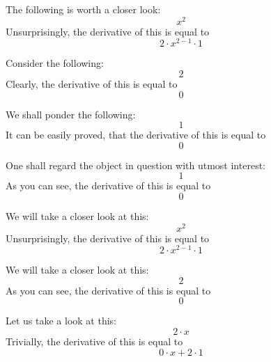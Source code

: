 \documentclass{article}
\begin{document}
The following is worth a closer look:
\begin{equation}
x ^{2 } 
\end{equation}
Unsurprisingly, the derivative of this is equal to
\begin{equation}
2 \cdot x ^{2 - 1 } \cdot 1 
\end{equation}

Consider the following:
\begin{equation}
2 
\end{equation}
Clearly, the derivative of this is equal to
\begin{equation}
0 
\end{equation}

We shall ponder the following:
\begin{equation}
1 
\end{equation}
It can be easily proved, that the derivative of this is equal to
\begin{equation}
0 
\end{equation}

One shall regard the object in question with utmost interest:
\begin{equation}
1 
\end{equation}
As you can see, the derivative of this is equal to
\begin{equation}
0 
\end{equation}

We will take a closer look at this:
\begin{equation}
x ^{2 } 
\end{equation}
Unsurprisingly, the derivative of this is equal to
\begin{equation}
2 \cdot x ^{2 - 1 } \cdot 1 
\end{equation}

We will take a closer look at this:
\begin{equation}
2 
\end{equation}
As you can see, the derivative of this is equal to
\begin{equation}
0 
\end{equation}

Let us take a look at this:
\begin{equation}
2 \cdot x 
\end{equation}
Trivially, the derivative of this is equal to
\begin{equation}
0 \cdot x + 2 \cdot 1 
\end{equation}
\end{document}

